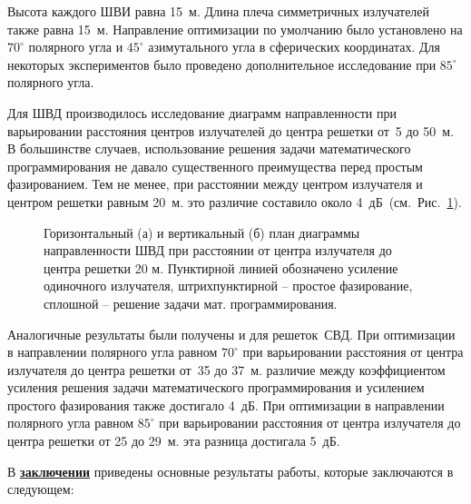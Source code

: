 Высота каждого ШВИ равна 15~м. Длина плеча симметричных излучателей также равна 15~м. Направление оптимизации по умолчанию было установлено на $70^{\circ}$ полярного угла и $45^{\circ}$ азимутального угла в сферических координатах. Для некоторых экспериментов было проведено дополнительное исследование при $85^{\circ}$ полярного угла.


Для ШВД производилось исследование диаграмм направленности при варьировании расстояния центров излучателей до центра решетки от~5 до 50~м. В большинстве случаев, использование решения задачи математического программирования не давало существенного преимущества перед простым фазированием. Тем не менее, при расстоянии между центром излучателя и центром решетки равным 20~м. это различие составило около 4~дБ~(см.~Рис.~\ref{pic:r_bvd_result}).

\begin{figure}
\begin{minipage}[h]{0.49\linewidth}
\end{minipage}
\hfill
\begin{minipage}[h]{0.49\linewidth}
\end{minipage}
\caption{Горизонтальный (а) и вертикальный (б) план диаграммы направленности ШВД при расстоянии от центра излучателя до центра решетки 20 м. Пунктирной линией обозначено усиление одиночного излучателя, штрихпунктирной – простое фазирование, сплошной – решение задачи мат. программирования.}
\label{pic:r_bvd_result}
\end{figure}

Аналогичные результаты были получены и для решеток~СВД. При оптимизации в направлении полярного угла равном $70^{\circ}$ при варьировании расстояния от центра излучателя до центра решетки от~35 до 37~м. различие между коэффициентом усиления решения задачи математического программирования и усилением простого фазирования также достигало 4~дБ.  При оптимизации в направлении полярного угла равном $85^{\circ}$ при варьировании расстояния от центра излучателя до центра решетки от 25 до 29~м. эта разница достигала 5~дБ.

\FloatBarrier
{}                                  %
В \underline{\textbf{заключении}} приведены основные результаты работы, которые заключаются в следующем:


